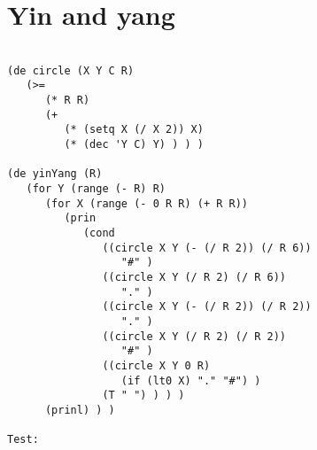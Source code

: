 \section*{Yin and yang}

\begin{verbatim}

(de circle (X Y C R)
   (>=
      (* R R)
      (+
         (* (setq X (/ X 2)) X)
         (* (dec 'Y C) Y) ) ) )

(de yinYang (R)
   (for Y (range (- R) R)
      (for X (range (- 0 R R) (+ R R))
         (prin
            (cond
               ((circle X Y (- (/ R 2)) (/ R 6))
                  "#" )
               ((circle X Y (/ R 2) (/ R 6))
                  "." )
               ((circle X Y (- (/ R 2)) (/ R 2))
                  "." )
               ((circle X Y (/ R 2) (/ R 2))
                  "#" )
               ((circle X Y 0 R)
                  (if (lt0 X) "." "#") )
               (T " ") ) ) )
      (prinl) ) )

Test:


\end{verbatim}
